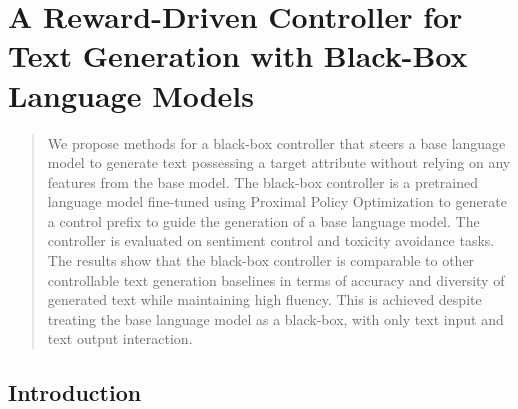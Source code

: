 \documentclass[phd,electronic,oneside,twosidetoc,letterpaper,chaptercenter,parttop,lof]{byumsphd}
\begin{document}
\chapter{A Reward-Driven Controller for Text Generation with Black-Box Language Models}
\label{chap:bbc}

\begin{abstract}
We propose methods for a black-box controller that steers a base language model to generate text possessing a target attribute without relying on any features from the base model.
The black-box controller is a pretrained language model fine-tuned using Proximal Policy Optimization to generate a control prefix to guide the generation of a base language model.
The controller is evaluated on sentiment control and toxicity avoidance tasks.
The results show that the black-box controller is comparable to other controllable text generation baselines in terms of accuracy and diversity of generated text while maintaining high fluency.
This is achieved despite treating the base language model as a black-box, with only text input and text output interaction.
\end{abstract}

\section{Introduction}
\label{introduction}

\end{document}
